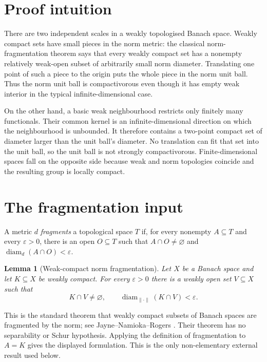 \documentclass[11pt]{article}
\newtheorem{lemma}[theorem]{Lemma}
\newcommand{\diam}{\operatorname{diam}}
\begin{document}
\section{Proof intuition}

There are two independent scales in a weakly topologised Banach space.
Weakly compact sets have small pieces in the norm metric: the classical
norm-fragmentation theorem says that every weakly compact set has a nonempty
relatively weak-open subset of arbitrarily small norm diameter.  Translating
one point of such a piece to the origin puts the whole piece in the norm unit
ball.  Thus the norm unit ball is compactivorous even though it has empty weak
interior in the typical infinite-dimensional case.

On the other hand, a basic weak neighbourhood restricts only finitely many
functionals.  Their common kernel is an infinite-dimensional direction on
which the neighbourhood is unbounded.  It therefore contains a two-point
compact set of diameter larger than the unit ball's diameter.  No translation
can fit that set into the unit ball, so the unit ball is not strongly
compactivorous.  Finite-dimensional spaces fall on the opposite side because
weak and norm topologies coincide and the resulting group is locally compact.

\section{The fragmentation input}

A metric $d$ \emph{fragments} a topological space $T$ if, for every nonempty
$A\subseteq T$ and every $\varepsilon>0$, there is an open $O\subseteq T$
such that $A\cap O\ne\varnothing$ and
$\diam_d(A\cap O)<\varepsilon$.

\begin{lemma}[Weak-compact norm fragmentation]\label{lem:fragment}
Let $X$ be a Banach space and let $K\subseteq X$ be weakly compact.  For every
$\varepsilon>0$ there is a weakly open set $V\subseteq X$ such that
\[
 K\cap V\ne\varnothing,
 \qquad \diam_{\|\cdot\|}(K\cap V)<\varepsilon.
\]
\end{lemma}

\noindent
This is the standard theorem that weakly compact subsets of Banach spaces are
fragmented by the norm; see Jayne--Namioka--Rogers
\cite{JayneNamiokaRogers}.  Their theorem has no separability or Schur
hypothesis.  Applying the definition of fragmentation to $A=K$ gives the
displayed formulation.  This is the only non-elementary external result used
below.
\end{document}
